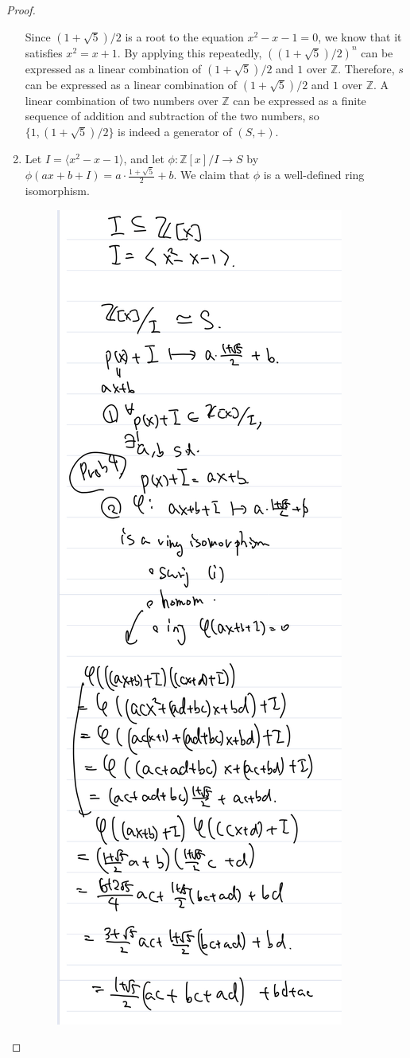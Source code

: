 \documentclass[12pt, psamsfonts]{amsart}
\theoremstyle{definition}
\theoremstyle{remark}
\numberwithin{equation}{section}
\begin{document}
\begin{proof}
\begin{enumerate}
      Since $(1 + \sqrt{5}) / 2$ is a root to the equation $x^2 - x - 1 = 0$, we know that it satisfies $x^2 = x + 1$.
      By applying this repeatedly, $((1 + \sqrt{5}) / 2)^n$ can be expressed as a linear combination of $(1 + \sqrt{5}) / 2$ and $1$ over $\mathbb{Z}$.
      Therefore, $s$ can be expressed as a linear combination of $(1 + \sqrt{5}) / 2$ and $1$ over $\mathbb{Z}$.
      A linear combination of two numbers over $\mathbb{Z}$ can be expressed as a finite sequence of addition and subtraction of the two numbers, so $\{ 1, (1 + \sqrt{5}) / 2 \}$ is indeed a generator of $(S, +)$.
    \item
      Let $I = \langle x^2 - x - 1 \rangle$, and let $\phi: \mathbb{Z}[x] / I \rightarrow S$ by $\phi(ax + b + I) = a \cdot \frac{1 + \sqrt{5}}{2} + b$.
      We claim that $\phi$ is a well-defined ring isomorphism.
      \begin{figure}
        \includegraphics[width=.5\linewidth]{isomorphism.jpeg}

\end{figure}
\end{enumerate}
\end{proof}
\end{document}
